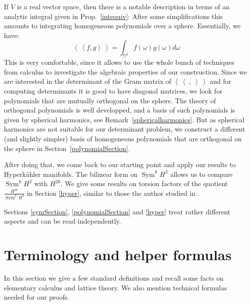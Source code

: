\documentclass{amsart}
\DeclareMathOperator{\Sym}{Sym}
\newcommand{\bra}{\left<\!\!\!\:\left<}
\newcommand{\ket}{\right>\!\!\!\:\right>}
\renewcommand{\S}{\mathbb{S}}
\theoremstyle{plain}
\theoremstyle{definition}
\theoremstyle{remark}
\begin{document}
If $V$ is a real vector space, then there is a notable description in terms of an analytic integral given in Prop.~\ref{intequiv}: After some simplifications this amounts to integrating homogeneous polynomials over a sphere. Essentially, we have:
$$ \bra f,g\ket = \int_{\S^d} f(\omega)g(\omega)d\omega $$
This is very comfortable, since it allows to use the whole bunch of techniques from calculus to investigate the algebraic properties of our construction.
Since we are interested in the determinant of the Gram matrix of $\bra\ ,\;\ket$
and for computing determinants it is good to have diagonal matrices, we look for polynomials that are mutually orthogonal on the sphere. The theory of orthogonal polynomials is well developped, and a basis of such polynomials is given by spherical harmonics, see Remark~\ref{sphericalharmonics}. But as spherical harmonics are not suitable for our determinant problem, we construct a different (and slightly simpler)
basis of homogeneous polynomials that are orthogonal on the sphere in Section~\ref{polynomialSection}.

After doing that, we come back to our starting point and apply our results to Hyperk\"ahler manifolds. The bilinear form on $\Sym^kH^2$ allows us to compare $\Sym^kH^2$ with $H^{2k}$. We give some results on torsion factors of the quotient $\frac{H^{2k}}{\Sym^kH^2}$ in Section \ref{hyper}, similar to those the author studied in \cite{Kapfer}.

Sections \ref{symSection}, \ref{polynomialSection} and \ref{hyper} treat rather different aspects and can be read independently.



\section{Terminology and helper formulas} \label{boring}
In this section 
we give a few standard definitions and recall some facts on elementary calculus and lattice theory. We also mention technical formulas needed for our proofs.
\end{document}
